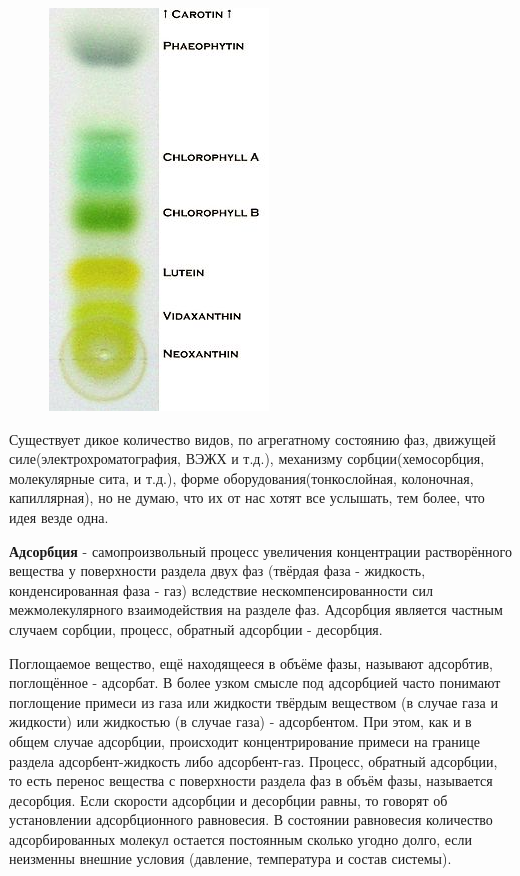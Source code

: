 \documentclass[14pt,a4paper]{scrartcl}
\begin{document}
\begin{figure}[htp]
\centering
\includegraphics[scale=.5]{chromatorgamm.jpg}
\caption{}
\label{}
\end{figure}

Существует дикое количество видов, по агрегатному состоянию фаз, движущей силе(электрохроматография, ВЭЖХ и т.д.), механизму сорбции(хемосорбция, молекулярные сита, и т.д.), форме оборудования(тонкослойная, колоночная, капиллярная), но не думаю, что их от нас хотят все услышать, тем более, что идея везде одна.

\textbf{Адсорбция} -  самопроизвольный процесс увеличения концентрации растворённого вещества у поверхности раздела двух фаз (твёрдая фаза - жидкость, конденсированная фаза - газ) вследствие нескомпенсированности сил межмолекулярного взаимодействия на разделе фаз. Адсорбция является частным случаем сорбции, процесс, обратный адсорбции - десорбция.

Поглощаемое вещество, ещё находящееся в объёме фазы, называют адсорбтив, поглощённое - адсорбат. В более узком смысле под адсорбцией часто понимают поглощение примеси из газа или жидкости твёрдым веществом (в случае газа и жидкости) или жидкостью (в случае газа) - адсорбентом. При этом, как и в общем случае адсорбции, происходит концентрирование примеси на границе раздела адсорбент-жидкость либо адсорбент-газ. Процесс, обратный адсорбции, то есть перенос вещества с поверхности раздела фаз в объём фазы, называется десорбция. Если скорости адсорбции и десорбции равны, то говорят об установлении адсорбционного равновесия. В состоянии равновесия количество адсорбированных молекул остается постоянным сколько угодно долго, если неизменны внешние условия (давление, температура и состав системы).
\end{document}

